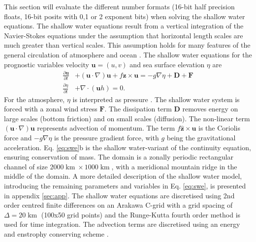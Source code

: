 \documentclass[draft]{agujournal2019}
\newcommand{\op}{\operatorname}
\begin{document}
This section will evaluate the different number formats (16-bit half precision floats, 16-bit posits with 0,1 or 2 exponent bits) when solving the shallow water equations. The shallow water equations result from a vertical integration of the Navier-Stokes equations under the assumption that horizontal length scales are much greater than vertical scales. This assumption holds for many features of the general circulation of atmosphere and ocean \cite{Gill1982,Vallis2006}. The shallow water equations for the prognostic variables velocity $\mathbf{u} = (u,v)$ and sea surface elevation $\eta$ are
\begin{subequations}
\begin{align}
\frac{\partial \mathbf{u}}{\partial t} &+ (\mathbf{u} \cdot \nabla) \mathbf{u} + f\hat{\mathbf{z}} \times \mathbf{u} = -g\nabla \eta + \mathbf{D} + \mathbf{F} \\
\frac{\partial \eta}{\partial t} &+ \nabla \cdot (\mathbf{u}h) = 0.
\end{align}
\label{eq:swe}%
\end{subequations}
For the atmosphere, $\eta$ is interpreted as pressure \cite{Gill1982}. The shallow water system is forced with a zonal wind stress $\mathbf{F}$. The dissipation term $\mathbf{D}$ removes energy on large scales (bottom friction) and on small scales (diffusion). The non-linear term $(\mathbf{u} \cdot \nabla) \mathbf{u}$ represents advection of momentum. The term $f\hat{\mathbf{z}} \times \mathbf{u}$ is the Coriolis force and $-g\nabla \eta$ is the pressure gradient force, with $g$ being the gravitational acceleration. Eq. \ref{eq:swe}b is the shallow water-variant of the continuity equation, ensuring conservation of mass. The domain is a zonally periodic rectangular channel of size $2000\op{km} \times 1000\op{km}$, with a meridional mountain ridge in the middle of the domain. A more detailed description of the shallow water model, introducing the remaining parameters and variables in Eq. \ref{eq:swe}, is presented in appendix \ref{sec:app}. The shallow water equations are discretised using 2nd order centred finite differences on an Arakawa C-grid \cite{Arakawa1977} with a grid spacing of $\Delta = 20\operatorname{km}$ (100x50 grid points) and the Runge-Kutta fourth order method \cite{Butcher2008} is used for time integration. The advection terms are discretised using an energy and enstrophy conserving scheme \cite{Arakawa1990}. 
\end{document}
